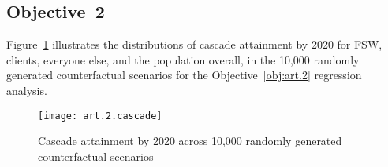 \subsection{Objective~2}\label{sr.art.2}
Figure~\ref{fig:art.2.cascade} illustrates the distributions of cascade attainment by 2020
for FSW, clients, everyone else, and the population overall,
in the 10,000 randomly generated counterfactual scenarios
for the Objective~\ref{obj:art.2} regression analysis.
\begin{figure}[h]
  \centering
  \texttt{[image: art.2.cascade]}
  \caption{Cascade attainment by 2020 across 10,000 randomly generated counterfactual scenarios}
  \label{fig:art.2.cascade}
\end{figure}
